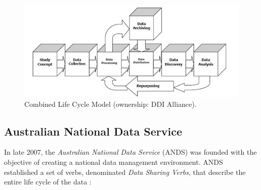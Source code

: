 \begin{figure}
    \center
    \includegraphics[width=\textwidth]{img/data_lifecycle/what-is-ddi-diagram.jpg}
    \caption{Combined Life Cycle Model (ownership: DDI Alliance).}
    \label{fig:ddi}
\end{figure}


\subsection{Australian National Data Service}

In late 2007, the \textit{Australian National Data Service} (ANDS) was founded with the objective of creating a national data management environment. ANDS established a set of verbs, denominated \textit{Data Sharing Verbs}, that describe the entire life cycle of the data \cite{burton_designing_2009}:

